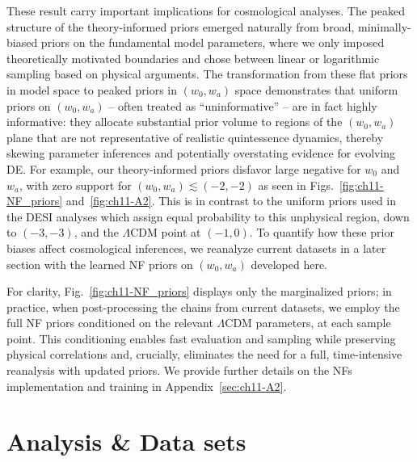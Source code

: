 These result carry important implications for cosmological analyses. The peaked structure of the theory-informed priors emerged naturally from broad, minimally-biased priors on the fundamental model parameters, where we only imposed theoretically motivated boundaries and chose between linear or logarithmic sampling based on physical arguments. The transformation from these flat priors in model space to peaked priors in $(w_0, w_a)$ space demonstrates that uniform priors on $(w_0, w_a)$ -- often treated as ``uninformative'' -- are in fact highly informative: they allocate substantial prior volume to regions of the $(w_0,w_a)$ plane that are not representative of realistic quintessence dynamics, thereby skewing parameter inferences and potentially overstating evidence for evolving DE. For example, our theory-informed priors disfavor large negative for $w_0$ and $w_a$, with zero support for $(w_0,w_a)\lesssim (-2,-2)$ as seen in Figs.~\ref{fig:ch11-NF_priors} and~\ref{fig:ch11-A2}. This is in contrast to the uniform priors used in the DESI analyses which assign equal probability to this unphysical region, down to $(-3,-3)$, and the $\Lambda$CDM point at $(-1, 0)$. To quantify how these prior biases affect cosmological inferences, we reanalyze current datasets in a later section with the learned NF priors on $(w_0,w_a)$ developed here.

For clarity, Fig.~\ref{fig:ch11-NF_priors} displays only the marginalized
 priors;  in practice, when post-processing the chains from current datasets, we employ the full NF priors conditioned on the relevant $\Lambda$CDM parameters,
 at each sample point. This conditioning enables fast evaluation and sampling while preserving physical correlations and, crucially, eliminates the need for a full, time-intensive reanalysis with updated priors.
We provide further details on the NFs implementation and training in Appendix~\ref{sec:ch11-A2}.


\section{Analysis \& Data sets} \label{sec:ch11-AnalysisAndDatasets}


